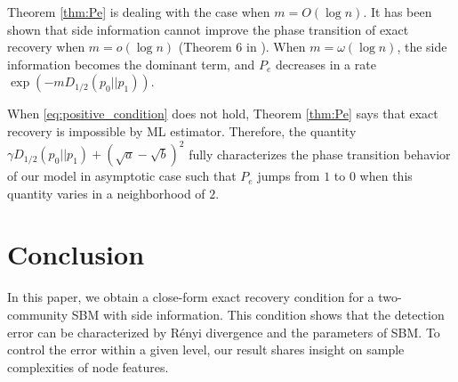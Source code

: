 \documentclass[conference]{IEEEtran}
\begin{document}
Theorem \ref{thm:Pe} is dealing with the case when $m=O(\log n)$. It has been shown
that side information cannot improve the phase transition of exact recovery when $m=o(\log n)$ (Theorem 6 in \cite{saad2018community}). When $m=\omega(\log n)$,
the side information becomes the dominant term, and $P_e$ decreases in a rate $\exp(-m D_{1/2}(p_0||p_1) )$.

When \eqref{eq:positive_condition} does not hold, Theorem \ref{thm:Pe} says that exact recovery is impossible by ML estimator.
Therefore, the quantity $\gamma D_{1/2}(p_0||p_1) + (\sqrt{a} - \sqrt{b})^2$ fully characterizes the 
phase transition behavior of our model in asymptotic case such that $P_e$ jumps from $1$ to $0$ when this quantity varies in a neighborhood of $2$.
\section{Conclusion}\label{s:conclusion}
In this paper, we obtain a close-form exact recovery condition for a two-community SBM with side information. This condition
shows that the detection error can be characterized by Rényi divergence and the parameters of SBM. To control the error within a given level,
our result shares insight on sample complexities of node features.
\end{document}
